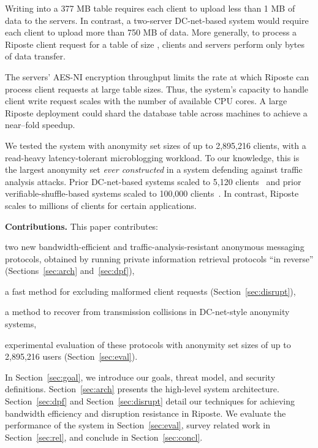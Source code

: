 \documentclass[10pt,twocolumn]{article}
\newcommand{\nicepara}[1]{\medskip\noindent\textbf{#1.}}
\newcommand{\name}{Riposte\xspace}
\begin{document}
Writing into a 377 MB table requires
each client to upload less than 1 MB of data to the servers.
In contrast, a two-server DC-net-based system would 
require each client to upload more than 750 MB of data.
More generally, to process a \name client request for a table of size ,
clients and servers perform only  bytes of data transfer.

The servers' AES-NI encryption throughput limits the 
rate at which \name can process client requests at large table sizes.
Thus, the system's capacity to handle client write request scales
with the number of available CPU cores.
A large \name deployment could shard the database table across
 machines to achieve a near--fold speedup.

We tested the system with anonymity set sizes of up to
2,895,216 clients, with a read-heavy latency-tolerant
microblogging workload.
To our knowledge, this is the largest anonymity set 
{\em ever constructed} in a system defending against 
traffic analysis attacks.
Prior DC-net-based systems scaled to 5,120 clients~\cite{wolinsky2012dissent}
and prior verifiable-shuffle-based systems 
scaled to 100,000 clients~\cite{bayer2012efficient}.
In contrast, \name scales to millions of clients for
certain applications.


\nicepara{Contributions}
This paper contributes:
\begin{compactitem}
  \item two new bandwidth-efficient and traffic-analysis-resistant 
        anonymous messaging protocols, 
        obtained by running private information retrieval 
        protocols ``in reverse'' (Sections~\ref{sec:arch} and~\ref{sec:dpf}),
  \item a fast method for excluding
        malformed client requests 
        (Section~\ref{sec:disrupt}), 
  \item a method to recover from transmission 
        collisions in DC-net-style anonymity systems, 
  \item experimental evaluation of these protocols with anonymity 
        set sizes of up to 2,895,216 users (Section~\ref{sec:eval}).
\end{compactitem}

\medskip
In Section~\ref{sec:goal}, we introduce our goals,
threat model, and security definitions.
Section~\ref{sec:arch} presents the high-level system
architecture. 
Section~\ref{sec:dpf} and Section~\ref{sec:disrupt}
detail our techniques for achieving bandwidth efficiency 
and disruption resistance in \name.
We evaluate the performance of the system in Section~\ref{sec:eval},
survey related work in Section~\ref{sec:rel}, and conclude
in Section~\ref{sec:concl}.
\end{document}

